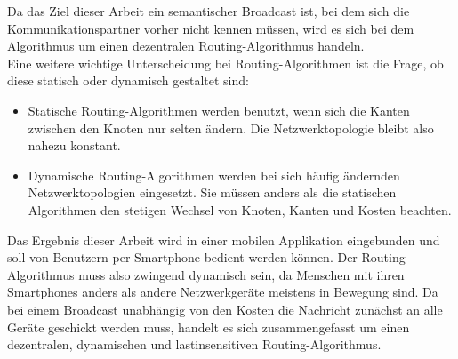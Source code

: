 Da das Ziel dieser Arbeit ein semantischer Broadcast ist, bei dem sich die Kommunikationspartner vorher nicht kennen müssen, wird es sich bei dem Algorithmus um einen dezentralen Routing-Algorithmus handeln.
\\Eine weitere wichtige Unterscheidung bei Routing-Algorithmen ist die Frage, ob diese statisch oder dynamisch gestaltet sind:
\begin{itemize}
	\item Statische Routing-Algorithmen werden benutzt, wenn sich die Kanten zwischen den Knoten nur selten ändern. Die Netzwerktopologie bleibt also nahezu konstant.
	\item Dynamische Routing-Algorithmen werden bei sich häufig ändernden Netzwerktopologien eingesetzt. Sie müssen anders als die statischen Algorithmen den stetigen Wechsel von Knoten, Kanten und Kosten beachten.
\end{itemize}
Das Ergebnis dieser Arbeit wird in einer mobilen Applikation eingebunden und soll von Benutzern per Smartphone bedient werden können. Der Routing-Algorithmus muss also zwingend dynamisch sein, da Menschen mit ihren Smartphones anders als andere Netzwerkgeräte meistens in Bewegung sind. Da bei einem Broadcast unabhängig von den Kosten die Nachricht zunächst an alle Geräte geschickt werden muss, handelt es sich zusammengefasst um einen dezentralen, dynamischen und \mbox{lastinsensitiven} Routing-Algorithmus. 
